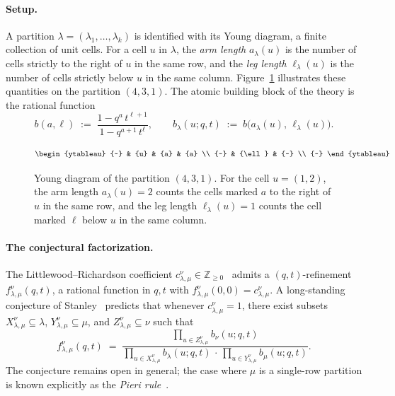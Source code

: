 \paragraph{Setup.}
A partition $\lambda=(\lambda_1,\dots,\lambda_k)$ is identified with its Young diagram, a finite collection of unit cells.
For a cell $u$ in $\lambda$, the \emph{arm length} $a_\lambda(u)$ is the number of cells strictly to the right of $u$ in the same row, and the \emph{leg length} $\ell_\lambda(u)$ is the number of cells strictly below $u$ in the same column.
Figure~\ref{fig:qtlr-partition} illustrates these quantities on the partition $(4,3,1)$.
The atomic building block of the theory is the rational function
\begin{equation}
b(a,\ell) \;:=\; \frac{1-q^{a}\,t^{\ell+1}}{1-q^{a+1}\,t^{\ell}},
\qquad
b_\lambda(u;q,t) \;:=\; b\bigl(a_\lambda(u),\,\ell_\lambda(u)\bigr).
\end{equation}

\begin{figure}[t]
  \centering
  \[
  \begin{ytableau}
     {~} & {u} & {a} & {a} \\
     {~} & {\ell} & {~} \\
     {~}
  \end{ytableau}
  \]
  \caption{Young diagram of the partition $(4,3,1)$.
  For the cell $u=(1,2)$, the arm length $a_\lambda(u)=2$ counts the cells marked $a$ to the right of $u$ in the same row, and the leg length $\ell_\lambda(u)=1$ counts the cell marked $\ell$ below $u$ in the same column.}
  \label{fig:qtlr-partition}
\end{figure}

\paragraph{The conjectural factorization.}
The Littlewood--Richardson coefficient $c^\nu_{\lambda,\mu}\in\mathbb{Z}_{\ge 0}$~\cite{LittlewoodRichardson1934} admits a $(q,t)$-refinement $f^\nu_{\lambda,\mu}(q,t)$, a rational function in $q,t$ with $f^\nu_{\lambda,\mu}(0,0)=c^\nu_{\lambda,\mu}$.
A long-standing conjecture of Stanley~\cite{Stanley1989} predicts that whenever $c^\nu_{\lambda,\mu}=1$, there exist subsets
$X^\nu_{\lambda,\mu}\subseteq\lambda$, $Y^\nu_{\lambda,\mu}\subseteq\mu$, and $Z^\nu_{\lambda,\mu}\subseteq\nu$ such that
\begin{equation}
\label{eq:stanley-factorization}
f^\nu_{\lambda,\mu}(q,t)
\;=\;
\frac{\prod_{u\in Z^\nu_{\lambda,\mu}} b_\nu(u;q,t)}
     {\prod_{u\in X^\nu_{\lambda,\mu}} b_\lambda(u;q,t)\,\cdot\,\prod_{u\in Y^\nu_{\lambda,\mu}} b_\mu(u;q,t)}.
\end{equation}
The conjecture remains open in general; the case where $\mu$ is a single-row partition is known explicitly as the \emph{Pieri rule}~\cite[p.~340]{Macdonald1995}.

